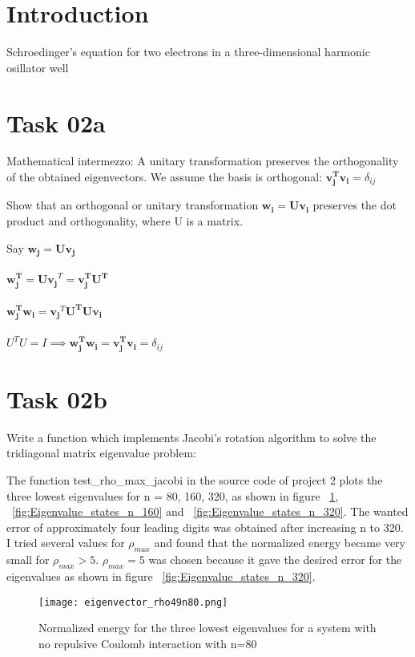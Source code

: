 \section{Introduction}
Schroedinger's equation for two electrons in a three-dimensional harmonic osillator well


\section{Task 02a}
Mathematical intermezzo: A unitary transformation preserves the orthogonality of the obtained eigenvectors. We assume the basis is orthogonal:
$\mathbf{v_j^Tv_i} = \delta_{ij}$

Show that an orthogonal or unitary transformation $\mathbf{w_i} = \mathbf{Uv_i}$ preserves the dot product and orthogonality, where U is a matrix.

Say $\mathbf{w_j} = \mathbf{Uv_j}$\\
\\
$\mathbf{w_j^T} = \mathbf{Uv_j}^T = \mathbf{v_j^TU^T}$\\
\\
$\mathbf{w_j^Tw_i} = \mathbf{v_j}^T \mathbf{U^TUv_i} $\\
\\
$U^TU = I \implies \mathbf{w_j^Tw_i} = \mathbf{v_j^Tv_i} = \delta_{ij}$



\section{Task 02b}
Write a function which implements Jacobi's rotation algorithm to solve the tridiagonal matrix eigenvalue problem:

The function test\_rho\_max\_jacobi in the source code of project 2 plots the three lowest eigenvalues for n = 80, 160, 320, as shown in figure ~\ref{fig:Eigenvalue_states_n_80}, ~\ref{fig:Eigenvalue_states_n_160} and ~\ref{fig:Eigenvalue_states_n_320}. The wanted error of approximately four leading digits was obtained after increasing n to 320. I tried several values for $\rho_{max}$ and found that the normalized energy became very small for $\rho_{max}>5$. $\rho_{max} = 5$ was chosen because it gave the desired error for the eigenvalues as shown in figure ~\ref{fig:Eigenvalue_states_n_320}.

\FloatBarrier
\begin{figure}[!ht]
\centering
\FloatBarrier
\texttt{[image: eigenvector\_rho49n80.png]}

\caption{Normalized energy for the three lowest eigenvalues for a system with no repulsive Coulomb interaction with n=80}
\label{fig:Eigenvalue_states_n_80}
\end{figure}
\FloatBarrier



